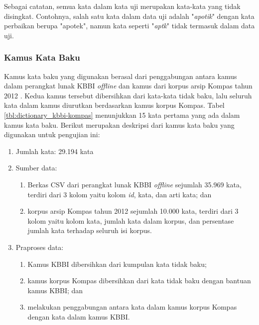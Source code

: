 Sebagai catatan, semua kata dalam kata uji merupakan kata-kata yang tidak disingkat. Contohnya, salah satu kata dalam data uji adalah "\textit{apotik}" dengan kata perbaikan berupa "apotek", namun kata seperti "\textit{aptk}" tidak termasuk dalam data uji.

\subsubsection{Kamus Kata Baku}

Kamus kata baku yang digunakan berasal dari penggabungan antara kamus dalam perangkat lunak KBBI \textit{offline} \parencite{sinaukbbi} dan kamus dari korpus arsip Kompas tahun 2012 \parencite{lanin2013distribusi}. Kedua kamus tersebut dibersihkan dari kata-kata tidak baku, lalu seluruh kata dalam kamus diurutkan berdasarkan kamus korpus Kompas. Tabel \ref{tbl:dictionary_kbbi-kompas} menunjukkan 15 kata pertama yang ada dalam kamus kata baku. Berikut merupakan deskripsi dari kamus kata baku yang digunakan untuk pengujian ini:
\begin{enumerate}
    \item Jumlah kata: 29.194 kata
    \item Sumber data: \begin{enumerate}
        \item Berkas CSV dari perangkat lunak KBBI \textit{offline} \parencite{sinaukbbi} sejumlah 35.969 kata, terdiri dari 3 kolom yaitu kolom \textit{id}, kata, dan arti kata; dan
        \item korpus arsip Kompas tahun 2012 \parencite{lanin2013distribusi} sejumlah 10.000 kata, terdiri dari 3 kolom yaitu kolom kata, jumlah kata dalam korpus, dan persentase jumlah kata terhadap seluruh isi korpus.
    \end{enumerate}
    \item Praproses data: \begin{enumerate}
        \item Kamus KBBI dibersihkan dari kumpulan kata tidak baku;
        \item kamus korpus Kompas dibersihkan dari kata tidak baku dengan bantuan kamus KBBI; dan
        \item melakukan penggabungan antara kata dalam kamus korpus Kompas dengan kata dalam kamus KBBI.
    \end{enumerate}
\end{enumerate}
